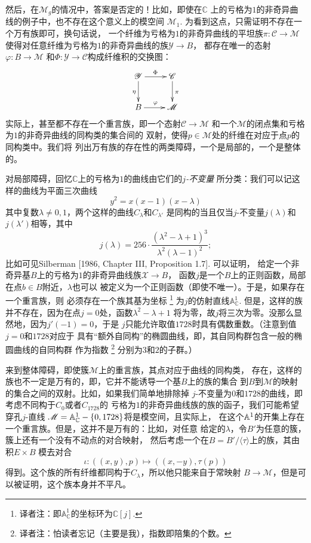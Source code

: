 
然后，在$\mathscr M_g$的情况中，答案是否定的！比如，即使在$\mathbb C$
上的亏格为$1$的非奇异曲线的例子中，也不存在这个意义上的模空间
$\mathscr M_1$. 为看到这点，只需证明不存在一个万有族即可，换句话说，
一个纤维为亏格为$1$的非奇异曲线的平坦族$\pi:\mathscr C\to \mathscr M$
使得对任意纤维为亏格为$1$的非奇异曲线的族$\mathscr Y\to B$，
都存在唯一的态射$\varphi:B\to \mathscr M$
和$\Phi:\mathscr Y\to \mathscr C$构成纤维积的交换图：
\[
    \xymatrix{
        \mathscr Y\ar[r]^\Phi \ar[d]_\eta & \mathscr C\ar[d]^\pi\\
        B \ar[r]^\varphi & \mathscr M
    }
\]
实际上，甚至都不存在一个重言族，即一个态射$\mathscr C\to\mathscr M$
和一个$\mathscr M$的闭点集和亏格为$1$的非奇异曲线的同构类的集合间的
双射，使得$p\in \mathscr M$处的纤维在对应于点$p$的同构类中。我们将
列出万有族的存在性的两类障碍，一个是局部的，一个是整体的。

对局部障碍，回忆$\mathbb C$上的亏格为$1$的曲线由它们的\emph{$j$-不变量}
所分类：我们可以记这样的曲线为平面三次曲线
\[
    y^2=x(x-1)(x-\lambda)
\]
其中复数$\lambda \neq 0,1$，两个这样的曲线$C_\lambda$和$C_{\lambda'}$
是同构的当且仅当$j$-不变量$j(\lambda)$和$j(\lambda')$相等，其中
\[
    j(\lambda)=256\cdot \frac{(\lambda^2-\lambda+1)^3}
    {\lambda^2(\lambda-1)^2};
\]
比如可见Silberman [1986, Chapter III, Proposition 1.7]. 可以证明，
给定一个非奇异基$B$上的亏格为$1$的非奇异曲线族$\mathscr X\to B$，
函数$j$是一个$B$上的正则函数，局部在点$b\in B$附近，$\lambda$也可以
被定义为一个正则函数（即使不唯一）。于是，如果存在一个重言族，则
必须存在一个族其基为坐标%
\footnote{译者注：即$\mathbb A_{\mathbb C}^1$的坐标环为$\mathbb C[j]$.}%
为$j$的仿射直线$\mathbb A_{\mathbb C}^1$.
但是，这样的族并不存在，因为在点$j=0$处，函数$\lambda^2-\lambda+1$
将为零，故$j$将三次为零。没那么显然地，因为$j'(-1)=0$，于是
$j$只能允许取值$1728$时具有偶数重数。（注意到值$j=0$和$1728$对应于
具有“额外自同构”的椭圆曲线，即，其自同构群包含一般的椭圆曲线的自同构群
作为指数%
\footnote{译者注：怕读者忘记（主要是我），指数即陪集的个数。}%
分别为$3$和$2$的子群。）


来到整体障碍，即使簇$\mathscr M$上的重言族，其点对应于曲线的同构类，
存在，这样的族也不一定是万有的，即，它并不能诱导一个基$B$上的族的集合
到$B$到$\mathscr M$的映射的集合之间的双射。比如，如果我们简单地排除掉
$j$-不变量为$0$和$1728$的曲线，即考虑不同构于$C_0$或者$C_{1728}$的
亏格为$1$的非奇异曲线族的族的函子，我们可能希望穿孔$j$-直线
$\mathscr M=\mathbb{A}_{\mathbb C}^1-\{0,1728\}$将是模空间，且实际上，
在这个$\mathbb{A}^1$的开集上存在一个重言族。但是，这并不是万有的：比如，对任意
给定的$\lambda$，令$B'$为任意的簇，簇上还有一个没有不动点的对合映射，
然后考虑一个在$B=B'/\langle \tau\rangle$上的族，其由积$E\times B$
模去对合
\[
    \iota:((x,y),p)\mapsto ((x,-y),\tau(p))
\]
得到。这个族的所有纤维都同构于$C_\lambda$，所以他只能来自于常映射
$B\to \mathscr M$，但是可以被证明，这个族本身并不平凡。

